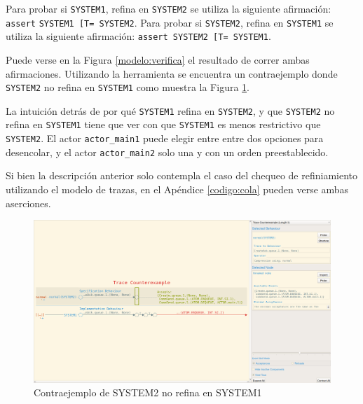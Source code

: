 Para probar si \verb$SYSTEM1$, refina en \verb$SYSTEM2$ se utiliza la siguiente afirmación: \verb$assert$ \verb$SYSTEM1 [T= SYSTEM2$. Para probar si \verb$SYSTEM2$, refina en \verb$SYSTEM1$ se utiliza la siguiente afirmación: \verb$assert SYSTEM2 [T= SYSTEM1$.

Puede verse en la Figura \ref{modelo:verifica} el resultado de correr ambas afirmaciones. Utilizando la herramienta se encuentra un contraejemplo donde \verb$SYSTEM2$ no refina en \verb$SYSTEM1$ como muestra la Figura \ref{modelo:contraejemplo}.

La intuición detrás de por qué \verb$SYSTEM1$ refina en \verb$SYSTEM2$, y que \verb$SYSTEM2$ no refina en \verb$SYSTEM1$ tiene que ver con que \verb$SYSTEM1$ es menos restrictivo que \verb$SYSTEM2$. El actor \verb=actor_main1= puede elegir entre entre dos opciones para desencolar, y el actor \verb=actor_main2= solo una y con un orden preestablecido.

Si bien la descripción anterior solo contempla el caso del chequeo de refiniamiento utilizando el modelo de trazas, en el Apéndice \ref{codigo:cola} pueden verse ambas aserciones.

\begin{figure}
\begin{center}
\includegraphics[width=15 cm]{img/contraejemplo.png}
\caption{Contraejemplo de SYSTEM2 no refina en SYSTEM1}\label{modelo:contraejemplo}
\end{center}
\end{figure}
 
